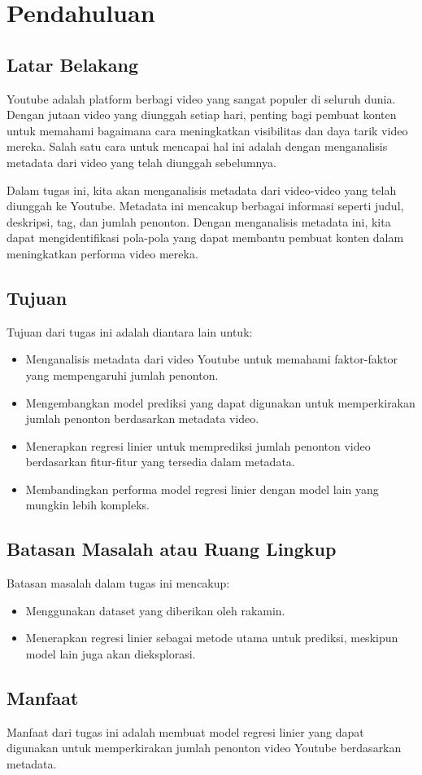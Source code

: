 \section{Pendahuluan}

\subsection{Latar Belakang}

Youtube adalah platform berbagi video yang sangat populer di seluruh dunia. Dengan jutaan video yang diunggah setiap hari, penting bagi pembuat konten untuk memahami bagaimana cara meningkatkan visibilitas dan daya tarik video mereka. Salah satu cara untuk mencapai hal ini adalah dengan menganalisis metadata dari video yang telah diunggah sebelumnya.

Dalam tugas ini, kita akan menganalisis metadata dari video-video yang telah diunggah ke Youtube. Metadata ini mencakup berbagai informasi seperti judul, deskripsi, tag, dan jumlah penonton. Dengan menganalisis metadata ini, kita dapat mengidentifikasi pola-pola yang dapat membantu pembuat konten dalam meningkatkan performa video mereka.

\subsection{Tujuan}
Tujuan dari tugas ini adalah diantara lain untuk:

\begin{itemize}
    \item Menganalisis metadata dari video Youtube untuk memahami faktor-faktor yang mempengaruhi jumlah penonton.
    \item Mengembangkan model prediksi yang dapat digunakan untuk memperkirakan jumlah penonton berdasarkan metadata video.
    \item Menerapkan regresi linier untuk memprediksi jumlah penonton video berdasarkan fitur-fitur yang tersedia dalam metadata.
    \item Membandingkan performa model regresi linier dengan model lain yang mungkin lebih kompleks.
\end{itemize}

\subsection{Batasan Masalah atau Ruang Lingkup}
Batasan masalah dalam tugas ini mencakup:
\begin{itemize}
    \item Menggunakan dataset yang diberikan oleh rakamin.
    \item Menerapkan regresi linier sebagai metode utama untuk prediksi, meskipun model lain juga akan dieksplorasi.
\end{itemize}

\subsection{Manfaat}
Manfaat dari tugas ini adalah membuat model regresi linier yang dapat digunakan untuk memperkirakan jumlah penonton video Youtube berdasarkan metadata.

\newpage
